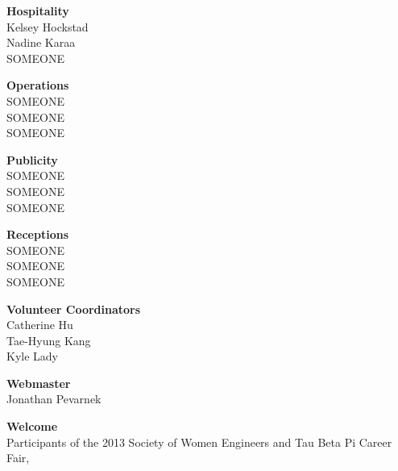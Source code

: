 \documentclass{article}
\begin{document}
\begin{center}
\begin{multicols}{2}
\begin{minipage}{\columnwidth}
\end{minipage}
	\begin{minipage}{\columnwidth}
	{\bf Hospitality}\\
	Kelsey Hockstad\\
	Nadine Karaa\\
	SOMEONE\\
	
\end{minipage}
	\begin{minipage}{\columnwidth}
	{\bf Operations}\\
	SOMEONE\\
	SOMEONE\\
	SOMEONE\\
	
\end{minipage}
	\begin{minipage}{\columnwidth}
	{\bf Publicity}\\
	SOMEONE\\
	SOMEONE\\
	SOMEONE\\
	
\end{minipage}
	\begin{minipage}{\columnwidth}
	{\bf Receptions}\\
	SOMEONE\\
	SOMEONE\\
	SOMEONE\\
	
\end{minipage}
	\begin{minipage}{\columnwidth}
	{\bf Volunteer Coordinators}\\
	Catherine Hu\\
	Tae-Hyung Kang\\
	Kyle Lady\\
	
\end{minipage}
	\begin{minipage}{\columnwidth}
	{\bf Webmaster}\\
	Jonathan Pevarnek\\
	
\end{minipage}
	\end{multicols}
\end{center}\newpage
{ \fontsize{16}{19}\selectfont \bf Welcome}\\Participants of the 2013 Society of Women Engineers and Tau Beta Pi Career Fair, 
\end{document}
